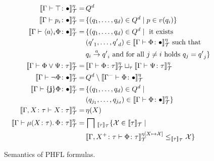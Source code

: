 \begin{figure}
    \caption{Semantics of PHFL formulas.}
    \label{figure:phfl-semantics}
    \begin{align*}
        \llbracket \Gamma \vdash \top \colon \bullet \rrbracket^\eta_\mathcal{T} =\,& Q^d\\
        \llbracket \Gamma \vdash p_i \colon \bullet \rrbracket^\eta_\mathcal{T} =\,& \{(q_1, \dots, q_d) \in Q^d \mid p \in v
        (q_i)\}\\
        \llbracket \Gamma \vdash \langle a \rangle_i \Phi \colon \bullet \rrbracket^\eta_\mathcal{T} =\,& \{(q_1,
        \dots, q_d) \in Q^d \mid \text{ it exists } \\& ({q'}_1, \dots, {q'}_d) \in \llbracket \Gamma \vdash \Phi \colon
\bullet \rrbracket^\eta_\mathcal{T} \text{ such that } \\&q_i \overset{a}{\rightarrow} {q'}_i \text{ and for all } j
        \neq
        i \text{ holds } q_j = {q'}_j\}\\
        \llbracket \Gamma \vdash \Phi \vee \Psi \colon \tau \rrbracket^\eta_\mathcal{T} =\,& \llbracket \Gamma \vdash \Phi
        \colon \tau \rrbracket ^\eta_\mathcal{T} \sqcup_\tau \llbracket \Gamma \vdash \Psi \colon \tau \rrbracket ^\eta_\mathcal{T}\\
        \llbracket \Gamma \vdash \neg \Phi \colon \bullet \rrbracket^\eta_\mathcal{T} =\,& Q^d \setminus \llbracket
        \Gamma^- \vdash \Phi
        \colon \bullet \rrbracket ^\eta_\mathcal{T}\\
        \llbracket \Gamma \vdash \{\emph{j}\} \Phi \colon \bullet \rrbracket^\eta_\mathcal{T} =\,&
        \{(q_1, \dots, q_d) \in Q^d \mid \\ &(q_{j_1}, \dots, q_{j_d}) \in \llbracket \Gamma \vdash \Phi
        \colon \bullet
        \rrbracket ^\eta_\mathcal{T}\}\\
        \llbracket \Gamma, X \colon \tau \vdash X \colon \tau \rrbracket^\eta_\mathcal{T} =\,& \eta(X)\\
        \llbracket \Gamma \vdash \mu (X \colon \tau).\,\Phi \colon \tau \rrbracket^\eta_\mathcal{T} =\,&
        \bigsqcap\,_{\llbracket\tau\rrbracket_\mathcal{T}} \{\mathcal{X} \in \llbracket \tau \rrbracket_\mathcal{T}
        \mid \\
        &\llbracket \Gamma, X^+ \colon \tau \vdash \Phi \colon \tau \rrbracket^{\eta[X \mapsto \mathcal{X}]}_\mathcal{T}
        \leq_{\llbracket \tau \rrbracket_\mathcal{T}} \mathcal{X}\}\\

\end{align*}
\end{figure}
